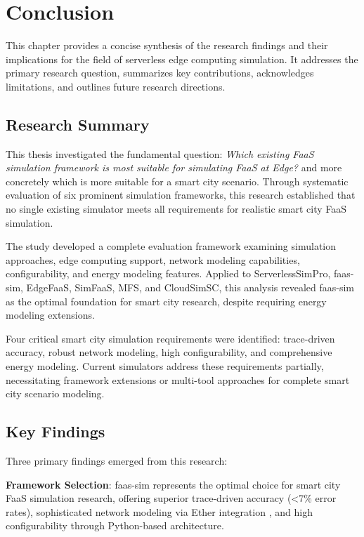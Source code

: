 \chapter{Conclusion}

This chapter provides a concise synthesis of the research findings and their implications for the field of serverless edge computing simulation. It addresses the primary research question, summarizes key contributions, acknowledges limitations, and outlines future research directions.

\section{Research Summary}

This thesis investigated the fundamental question: \textit{Which existing FaaS simulation framework is most suitable for  simulating FaaS at Edge?} and more concretely which is more suitable for a smart city scenario. Through systematic evaluation of six prominent simulation frameworks, this research established that no single existing simulator meets all requirements for realistic smart city FaaS simulation.

The study developed a complete evaluation framework examining simulation approaches, edge computing support, network modeling capabilities, configurability, and energy modeling features. Applied to ServerlessSimPro, faas-sim, EdgeFaaS, SimFaaS, MFS, and CloudSimSC, this analysis revealed faas-sim as the optimal foundation for smart city research, despite requiring energy modeling extensions.

Four critical smart city simulation requirements were identified: trace-driven accuracy, robust network modeling, high configurability, and comprehensive energy modeling. Current simulators address these requirements partially, necessitating framework extensions or multi-tool approaches for complete smart city scenario modeling.

\section{Key Findings}



Three primary findings emerged from this research:

\textbf{Framework Selection}: faas-sim represents the optimal choice for smart city FaaS simulation research, offering superior trace-driven accuracy (<7\% error rates), sophisticated network modeling via Ether integration \cite{rausch2020ether}, and high configurability through Python-based architecture.

